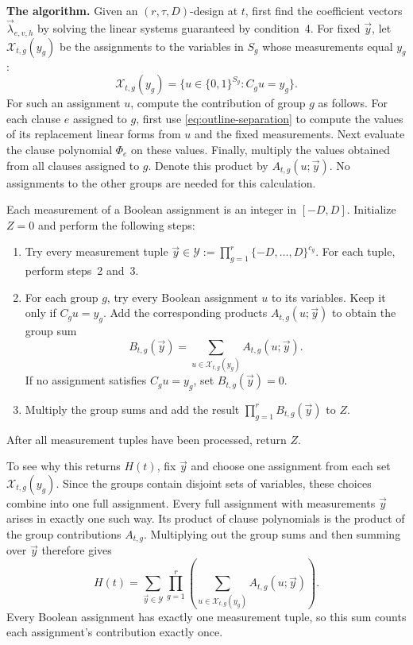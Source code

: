 \documentclass[11pt,reqno]{amsart}
\numberwithin{equation}{section}
\theoremstyle{definition}\newtheorem{definition}[theorem]{Definition}
\theoremstyle{remark}\newtheorem{remark}[theorem]{Remark}
\begin{document}
\smallskip\noindent
\textbf{The algorithm.}
Given an $(r,\tau,D)$-design at $t$,
first find the coefficient vectors $\vec{\lambda}_{e,v,h}$ by
solving the linear systems guaranteed by condition~4.
For fixed $\vec{y}$, let $\mathcal X_{t,g}(y_g)$ be the assignments
to the variables in $S_g$ whose measurements equal $y_g$:
\[
 \mathcal X_{t,g}(y_g)
 =\{u\in\{0,1\}^{S_g}:C_gu=y_g\}.
\]
For such an assignment $u$, compute the contribution of group $g$
as follows. For each clause $e$ assigned to $g$, first use
\eqref{eq:outline-separation} to compute the values of its
replacement linear forms from $u$ and the fixed measurements.
Next evaluate the clause polynomial $\Phi_e$ on these values.
Finally, multiply the values
obtained from all clauses assigned to $g$. Denote this product
by $A_{t,g}(u;\vec{y})$. No assignments to the other groups are
needed for this calculation.

Each measurement of a Boolean assignment is an integer in
$[-D,D]$. Initialize $Z=0$ and perform the following steps:
\begin{enumerate}
\item Try every measurement tuple
$\vec{y}\in\mathcal Y:=\prod_{g=1}^r\{-D,\ldots,D\}^{c_g}$.
For each tuple, perform steps~2 and~3.
\item For each group $g$, try every Boolean assignment $u$ to its
variables. Keep it only if $C_gu=y_g$. Add the corresponding
products $A_{t,g}(u;\vec{y})$ to obtain the group sum
\[
 B_{t,g}(\vec{y})=
 \sum_{u\in\mathcal X_{t,g}(y_g)}A_{t,g}(u;\vec{y}).
\]
If no assignment satisfies $C_gu=y_g$, set $B_{t,g}(\vec{y})=0$.
\item Multiply the group sums and add the result
$\prod_{g=1}^r B_{t,g}(\vec{y})$ to $Z$.
\end{enumerate}
After all measurement tuples have been processed, return $Z$.

To see why this returns $H(t)$, fix $\vec{y}$ and choose one
assignment from each set $\mathcal X_{t,g}(y_g)$. Since the groups
contain disjoint sets of variables, these choices combine into
one full assignment. Every full assignment with measurements
$\vec{y}$ arises in exactly one such way. Its product of clause
polynomials is the product of the group contributions
$A_{t,g}$. Multiplying out the group sums and then summing over
$\vec{y}$ therefore gives
\begin{equation}\label{eq:outline-separated-sum}
 H(t)=\sum_{\vec{y}\in\mathcal Y}\prod_{g=1}^r
       \left(\sum_{u\in\mathcal X_{t,g}(y_g)}
                         A_{t,g}(u;\vec{y})\right).
\end{equation}
Every Boolean assignment has exactly one measurement tuple, so
this sum counts each assignment's contribution exactly once.
\end{document}
